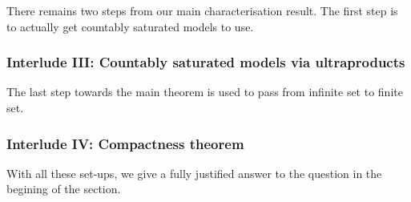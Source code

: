 \documentclass[letterpaper]{article}
\begin{document}
There remains two steps from our main characterisation result. The first step is to actually get countably saturated models to use.
\subsubsection{Interlude III: Countably saturated models via ultraproducts}

The last step towards the main theorem is used to pass from infinite set to finite set.
\subsubsection{Interlude IV: Compactness theorem}

With all these set-ups, we give a fully justified answer to the question in the begining of the section. 
\end{document}
